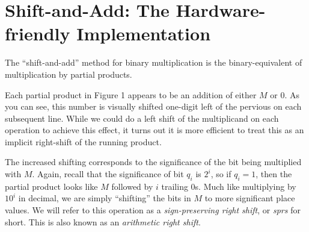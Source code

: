 \documentclass{article}
\begin{document}

\section{Shift-and-Add: The Hardware-friendly Implementation} %
The ``shift-and-add'' method for binary multiplication is the binary-equivalent of multiplication by partial products.

Each partial product in Figure 1 appears to be an addition of either $M$ or $0$.
As you can see, this number is visually shifted one-digit left of the pervious on each subsequent line.
While we could do a left shift of the multiplicand on each operation to achieve this effect, it turns out it is more efficient to treat this as an implicit right-shift of the running product.

The increased shifting corresponds to the significance of the bit being multiplied with $M$.
Again, recall that the significance of bit $q_i$ is $2^i$, so if $q_i = 1$, then the partial product looks like $M$ followed by $i$ trailing 0s.
Much like multiplying by $10^i$ in decimal, we are simply ``shifting'' the bits in $M$ to more significant place values.
We will refer to this operation as a \emph{sign-preserving right shift}, or \emph{sprs} for short.
This is also known as an \emph{arithmetic right shift}.
\end{document}
